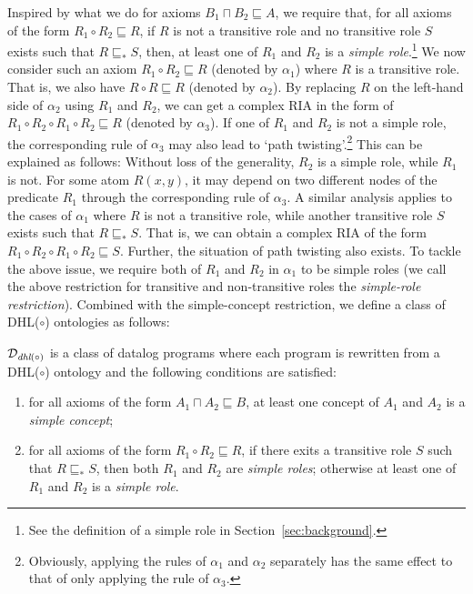 Inspired by what we do for axioms $B_1\sqcap B_2\sqsubseteq A$,
we require that, for all axioms of the form $R_1\circ R_2\sqsubseteq R$,
if $R$ is not a transitive role and no transitive role $S$ exists such that $R\sqsubseteq_* S$,
then, at least one of $R_1$ and $R_2$ is
a \emph{simple role}.\footnote{See the definition of a simple role in Section~\ref{sec:background}.}
We now consider such an axiom $R_1\circ R_2\sqsubseteq R$ (denoted by $\alpha_1$) where $R$ is a transitive role.
That is, we also have $R\circ R\sqsubseteq R$ (denoted by $\alpha_2$).
By replacing $R$ on the left-hand side of $\alpha_2$ using $R_1$ and $R_2$,
we can get a complex RIA in the form of
$R_1\circ R_2\circ R_1\circ R_2\sqsubseteq R$ (denoted by $\alpha_3$).
If one of $R_1$ and $R_2$ is not a simple role, the corresponding
rule of $\alpha_3$ may also lead to `path twisting'.\footnote{Obviously, applying the rules of $\alpha_1$
and $\alpha_2$ separately has the same effect to that of only applying the rule of $\alpha_3$.}
This can be explained as follows:
Without loss of the generality,
$R_2$ is a simple role, while $R_1$ is not.
For some atom $R(x,y)$, it may depend on two different nodes of the predicate $R_1$
through the corresponding rule of $\alpha_3$. A similar analysis applies to
the cases of $\alpha_1$ where $R$ is not a transitive role, while another transitive
role $S$ exists such that $R\sqsubseteq_* S$. That is, we can obtain
a complex RIA of the form $R_1\circ R_2\circ R_1\circ R_2\sqsubseteq S$.
Further, the situation of path twisting also exists.
To tackle the above issue,
we require both of $R_1$ and $R_2$ in $\alpha_1$ to be simple roles
(we call the above restriction for transitive and non-transitive roles
the \emph{simple-role restriction}).
Combined with the simple-concept restriction,
we define a class of DHL($\circ$) ontologies as follows:

\begin{definition}\label{def:dhlplus}
$\mathcal{D}_{\textit{\text{dhl}}(\circ)}$ is a class of datalog programs where each program
is rewritten from a DHL($\circ$) ontology and the following
conditions are satisfied:
\begin{enumerate}[leftmargin=4ex,label=\arabic*.]
\item for all axioms of the form $A_1\sqcap A_2\sqsubseteq B$,
    at least one concept of $A_1$ and $A_2$ is a \emph{simple concept};
\item for all axioms of the form $R_1\circ R_2\sqsubseteq R$,
    if there exits a transitive role $S$ such that
    $R\sqsubseteq_* S$, then both $R_1$ and $R_2$ are \emph{simple
      roles}; otherwise at least one of $R_1$ and $R_2$ is a \emph{simple role}.
\end{enumerate}
\end{definition}

